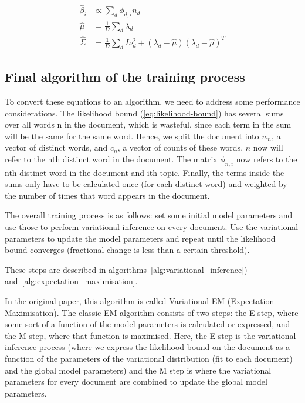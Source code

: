 \documentclass[12pt,a4paper,twoside,openright]{report}
\begin{document}
\begin{align}
\hat\beta_i & \propto \sum\limits_d\phi_{d, i}n_d \\ \label{eq:betaopt}
\hat\mu & = \frac{1}{D} \sum\limits_d\lambda_d \\ 
\hat\Sigma & = \frac{1}{D} \sum\limits_d I\nu^2_d + (\lambda_d - \hat\mu)(\lambda_d - \hat\mu)^T
\end{align}

\subsection{Final algorithm of the training process}

To convert these equations to an algorithm, we need to address some performance considerations. The likelihood bound (\ref{eq:likelihood-bound}) has several sums over all words n in the document, which is wasteful, since each term in the sum will be the same for the same word. Hence, we split the document into $w_n$, a vector of distinct words, and $c_n$, a vector of counts of these words. $n$ now will refer to the nth distinct word in the document. The matrix $\phi_{n, i}$ now refers to the nth distinct word in the document and ith topic. Finally, the terms inside the sums only have to be calculated once (for each distinct word) and weighted by the number of times that word appears in the document.

The overall training process is as follows: set some initial model parameters and use those to perform variational inference on every document. Use the variational parameters to update the model parameters and repeat until the likelihood bound converges (fractional change is less than a certain threshold).

These steps are described in algorithms~\ref{alg:variational_inference}) and~\ref{alg:expectation_maximisation}. 

In the original paper, this algorithm is called Variational EM (Expectation-Maximisation). The classic EM algorithm consists of two steps: the E step, where some sort of a function of the model parameters is calculated or expressed, and the M step, where that function is maximised. Here, the E step is the variational inference process (where we express the likelihood bound on the document as a function of the parameters of the variational distribution (fit to each document) and the global model parameters) and the M step is where the variational parameters for every document are combined to update the global model parameters.
\end{document}
